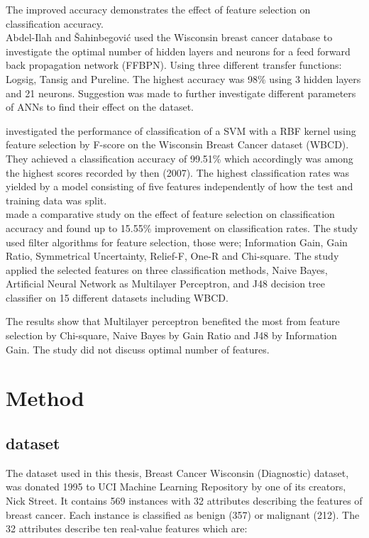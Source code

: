 \documentclass{kththesis}
\begin{document}
The improved accuracy demonstrates the effect of feature selection on classification accuracy.\\

Abdel-Ilah and {\v{S}}ahinbegovi{\'{c}} \parencite{Abdel-Ilah2017} used the Wisconsin breast cancer database to investigate the optimal number of hidden layers and neurons for a feed forward back propagation network (FFBPN). Using three different transfer functions: Logsig, Tansig and Pureline. The highest accuracy was 98\% using 3 hidden layers and 21 neurons. Suggestion was made to further investigate different parameters of ANNs to find their effect on the dataset.

\textcite{akay2009} investigated the performance of classification of a SVM with a RBF kernel using feature selection by F-score on the Wisconsin Breast Cancer dataset (WBCD). They achieved a classification accuracy of 99.51\% which accordingly was among the highest scores recorded by then (2007). The highest classification rates was yielded by a model consisting of five features independently of how the test and training data was split. \\

\textcite{karabulut2012} made a comparative study on the effect of feature selection on classification accuracy and found up to 15.55\% improvement on classification rates. The study used filter algorithms for feature selection, those were; Information Gain, Gain Ratio, Symmetrical Uncertainty, Relief-F, One-R and Chi-square. The study applied the selected features on three classification methods, Naive Bayes, Artificial Neural Network as Multilayer Perceptron, and J48 decision tree classifier on 15 different datasets including WBCD.

The results show that Multilayer perceptron benefited the most from feature selection by Chi-square, Naive Bayes by Gain Ratio and J48 by Information Gain. The study did not discuss optimal number of features.

\chapter{Method}

\section{dataset}

The dataset used in this thesis, Breast Cancer Wisconsin (Diagnostic) dataset, was donated 1995 to UCI  Machine Learning Repository \parencite{dua:2017} by one of its creators, Nick Street. It contains 569 instances with 32 attributes describing the features of breast cancer. Each instance is classified as benign (357) or malignant (212). The 32 attributes describe ten real-value features which are:
\end{document}
